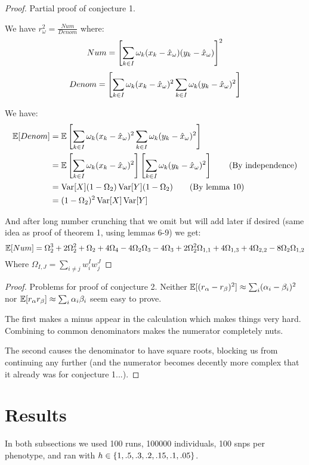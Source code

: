 \documentclass[11pt]{hw-template}
\begin{document}
  \begin{proof} Partial proof of conjecture 1.
    
    We have $r_\omega^2 = \frac{Num}{Denom}$ where:
    $$Num = \left[\sum_{k \in I} \omega_k(x_k - \hat{x}_\omega)(y_k - \hat{x}_\omega)\right]^2$$
    $$Denom = \left[\sum_{k \in I} \omega_k (x_k - \hat{x}_\omega)^2\sum_{k \in I} \omega_k(y_k - \hat{x}_\omega)^2\right]$$
    
    
    We have:
    \begin{align*}
      \operatorname{\mathbb{E}}[Denom] 
      &= \operatorname{\mathbb{E}}\left[\sum_{k \in I} \omega_k (x_k - \hat{x}_\omega)^2\sum_{k \in I} \omega_k(y_k - \hat{x}_\omega)^2\right]\\
      &= \operatorname{\mathbb{E}}\left[\sum_{k \in I} \omega_k (x_k - \hat{x}_\omega)^2\right]\left[\sum_{k \in I} \omega_k(y_k - \hat{x}_\omega)^2\right] \tag{By independence}\\
      &= \operatorname{Var}[X] (1 - \Omega_2) \operatorname{Var}[Y] (1 - \Omega_2) \tag{By lemma 10}\\
      &= (1 - \Omega_2)^2 \operatorname{Var}[X]\operatorname{Var}[Y] 
    \end{align*}
    
    And after long number crunching that we omit but will add later if desired (same idea as proof of theorem 1, using lemmas 6-9) we get:
    $$\operatorname{\mathbb{E}}[Num] = \Omega_2^3 + 2\Omega_2^2 + \Omega_2 + 4\Omega_4 - 4\Omega_2\Omega_3 -4\Omega_3 + 2\Omega_2^2\Omega_{1, 1} + 4\Omega_{1, 3} + 4\Omega_{2, 2} -8\Omega_2\Omega_{1, 2}$$
    Where $\Omega_{I, J} = \sum_{i \neq j} w_i^Iw_j^J$
    
  \end{proof}

  \begin{proof} Problems for proof of conjecture 2.
    Neither $\operatorname{\mathbb{E}}[(r_\alpha - r_\beta)^2] \approx \sum_i (\alpha_i - \beta_i)^2$ nor $\operatorname{\mathbb{E}}[r_\alpha r_\beta] \approx \sum_i \alpha_i \beta_i$ seem easy to prove.
    
    The first makes a minus appear in the calculation which makes things very hard. Combining to common denominators makes the numerator completely nuts.
    
    The second causes the denominator to have square roots, blocking us from continuing any further (and the numerator becomes decently more complex that it already was for conjecture 1...).
  \end{proof}

\section*{Results}
In both subsections we used 100 runs, 100000 individuals, 100 snps per phenotype, and ran with $h \in \left\{1, .5, .3, .2, .15, .1, .05\right\}$.
\end{document}
